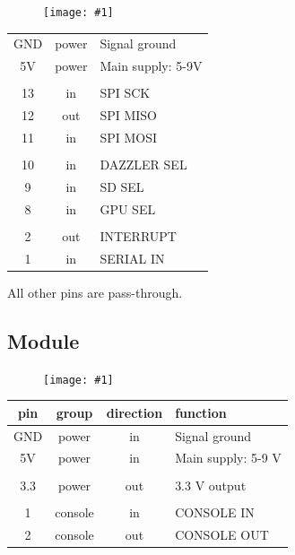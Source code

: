 \documentclass{article}
\newcommand{\pngw}[2]{
\begin{figure}[H]
\begin{center}
\texttt{[image: \#1]}
\end{center}
\end{figure}
}
\newcommand{\gap}{\vspace{10pt}}
\begin{document}
\pngw{img/gameduino-3x-dazzler/pinout-shield}{0.9}

\gap
\begin{center}
\begin{tabular}{ccl}
\hline
GND	& power & Signal ground \\
5V	& power	& Main supply: 5-9V \\
\\
13	& in	& SPI SCK \\
12	& out	& SPI MISO \\
11	& in	& SPI MOSI \\
\\
10	& in	& DAZZLER SEL \\
9	& in	& SD SEL \\
8	& in	& GPU SEL \\
\\
2	& out	& INTERRUPT \\
1	& in 	& SERIAL IN \\
\hline
\end{tabular}
\end{center}
\gap

All other pins are pass-through.

\subsection{Module}

\pngw{img/gameduino-3x-dazzler/pinout}{0.9}

\gap
\begin{center}
\begin{tabular}{cccl}
\textbf{pin} & \textbf{group} & \textbf{direction} & \textbf{function} \\
\hline
GND	& power & in & Signal ground \\
5V	& power	& in & Main supply: 5-9 V \\
\\
3.3	& power	& out & 3.3 V output \\
\\
1       & console & in    & CONSOLE IN \\
2       & console & out   & CONSOLE OUT \\
\hline
\end{tabular}
\end{center}
\gap
\end{document}

